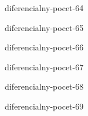 \begin{defproblem}{diferencialny-pocet-64}

\end{defproblem}

\begin{defproblem}{diferencialny-pocet-65}

\end{defproblem}

\begin{defproblem}{diferencialny-pocet-66}

\end{defproblem}

\begin{defproblem}{diferencialny-pocet-67}

\end{defproblem}

\begin{defproblem}{diferencialny-pocet-68}

\end{defproblem}

\begin{defproblem}{diferencialny-pocet-69}

\end{defproblem}